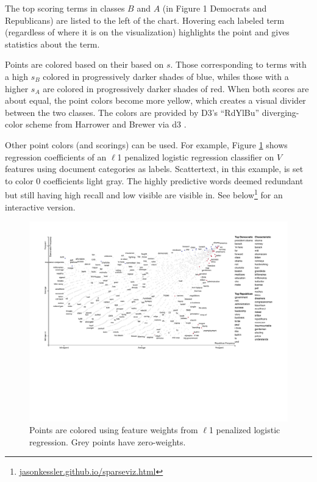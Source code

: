 \documentclass[11pt]{article}
\begin{document}
The top scoring terms in classes $B$ and $A$ (in Figure 1 Democrats and Republicans) are listed to the left of the chart.  Hovering each labeled term (regardless of where it is on the visualization) highlights the point and gives statistics about the term.  

Points are colored based on their based on $s$.  Those corresponding to terms with a high $s_B$ colored in progressively darker shades of blue, whiles those with a higher $s_A$ are colored in progressively darker shades of red.  When both scores are about equal, the point colors become more yellow, which creates a visual divider between the two classes.   The colors are provided by D3's ``RdYlBu'' diverging-color scheme from Harrower and Brewer \cite{colorbrewer} via d3 \cite{d3}.

Other point colors (and scorings) can be used.  For example, Figure \ref{scattertextsparse} shows regression coefficients of an $\ell$1 penalized logistic regression classifier on $V$ features using document categories as labels.  Scattertext, in this example, is set to color 0 coefficients light gray.  The highly predictive words deemed redundant but still having high recall and low visible are visible in.  See below\footnote{
\href{https://jasonkessler.github.io/sparseviz.html}{jasonkessler.github.io/sparseviz.html}} for an interactive version.

\begin{figure}[h]
  \includegraphics[width=\linewidth]{sparse_scattertext}
  \caption{Points are colored using feature weights from $\ell$1 penalized logistic regression.  Grey points have zero-weights.}
  \label{scattertextsparse}
\end{figure}
\end{document}
